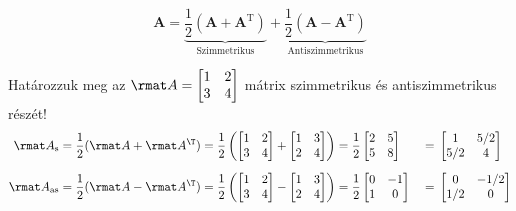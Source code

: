 \documentclass[a4paper, 12pt]{scrartcl}
\begin{document}
\begin{blueBox}

  $$
    \textbf{A} = \underbrace{\frac{1}{2}(\textbf{A} + \textbf{A}^{\text{T}})}_{\text{Szimmetrikus}} + \underbrace{\frac{1}{2}(\textbf{A} - \textbf{A}^{\text{T}})}_{\text{Antiszimmetrikus}}
  $$
\end{blueBox}

\begin{example}
  Határozzuk meg az $\rmat A = \begin{bmatrix}
      1 & 2 \\
      3 & 4
    \end{bmatrix}$ mátrix szimmetrikus és antiszimmetrikus részét!
  \begin{alignat*}{9}
    \rmat A_\text{s}
     & = \frac{1}{2}(\rmat A + \rmat A^\T)
    = \frac{1}{2}\left(
    \begin{bmatrix}
        1 & 2 \\
        3 & 4
      \end{bmatrix}
    +
    \begin{bmatrix}
        1 & 3 \\
        2 & 4
      \end{bmatrix}
    \right)
    = \frac{1}{2}
    \begin{bmatrix}
      2 & 5 \\
      5 & 8
    \end{bmatrix}
     & \;=\;                               &
    \begin{bmatrix}
      1   & 5/2 \\
      5/2 & 4
    \end{bmatrix}
    \\[2mm]
    \rmat A_\text{as}
     & = \frac{1}{2}(\rmat A - \rmat A^\T)
    = \frac{1}{2}\left(
    \begin{bmatrix}
        1 & 2 \\
        3 & 4
      \end{bmatrix}
    -
    \begin{bmatrix}
        1 & 3 \\
        2 & 4
      \end{bmatrix}
    \right)
    = \frac{1}{2}
    \begin{bmatrix}
      0 & -1 \\
      1 & 0
    \end{bmatrix}
     & \;=\;                               &
    \begin{bmatrix}
      0   & -1/2 \\
      1/2 & 0
    \end{bmatrix}
  \end{alignat*}
\end{example}
\end{document}
